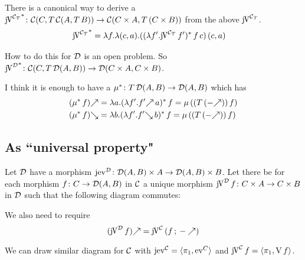 \documentclass[runningheads,envcountsame]{llncs}
\begin{document}
\begin{remark}
    There is a canonical way to derive a ${\juncurry[\C_T]}^*\colon \homC{C}{T\,\homC{A}{T\,B}} \to \homC{C \times A}{T\,(C \times B)}$ from the above $\juncurry[\C_T]$.
    \begin{align}
        {\juncurry[\C_T]}^* & = \lambda f. \lambda (c, a). ((\lambda f'. \juncurry[\C_T]\,f')^*\,f\,c)\,(c, a)
    \end{align}
    
    How to do this for $\mathcal{D}$ is an open problem. So ${\juncurry[\D]}^*\colon \homC{C}{T\,\homD{A}{B}} \to \homD{C \times A}{C \times B}$. 
    
    I think it is enough to have a $\mu^*\colon T\,\mathcal{D}(A, B) \to \mathcal{D}(A, B)$ which has
    \begin{align}
        \f{(\mu^*\,f)} &= \lambda a. (\lambda f'. \f{f'}\,a)^*\,f = \mu\,((T\,(\f{-}))\,f) \\
        \b{(\mu^*\,f)} &= \lambda b. (\lambda f'. \b{f'}\,b)^*\,f = \mu\,((T\,(\f{-}))\,f)
    \end{align}
\end{remark}

\subsection{As ``universal property"}

Let $\mathcal{D}$ have a morphism $\jeval[\D]\colon \homD{A}{B} \times A \to \homD{A}{B} \times B$. Let 
there be for each morphism $f\colon C \to \mathcal{D}(A, B)$ in $\mathcal{C}$ a unique morphism $\juncurry[\D]\,f\colon C \times A \to C \times B$ in $\mathcal{D}$ such that the following diagram commutes:


We also need to require
\[
\f{(\juncurry[\D]\,f)} = \juncurry[\C]\,(\comp{f}{\f{-}})
\]

We can draw similar diagram for $\mathcal{C}$ with $\jeval[\C] = \langle \pi_1, \eval[C] \rangle$ and $\juncurry[\C]\,f = \langle \pi_1, \uncurry\,f \rangle$. 

\end{document}
